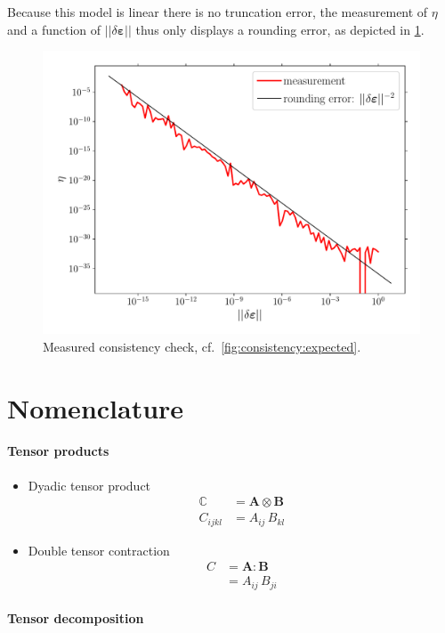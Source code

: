 \documentclass[namecite, fleqn]{goose-article}
\begin{document}
Because this model is linear there is no truncation error, the measurement of $\eta$ and a
function of $|| \delta \bm{\varepsilon} ||$ thus only displays a rounding error,
as depicted in \cref{fig:consistency}.

\begin{figure}[htp]
    \centering
    \includegraphics[width=.5\textwidth]{examples/consistency}
    \caption{Measured consistency check, cf.\ \cref{fig:consistency:expected}.}
    \label{fig:consistency}
\end{figure}

\appendix

\section{Nomenclature}
\label{sec:ap:nomenclature}

\paragraph{Tensor products}
\vspace*{.5eM}

\begin{itemize}

    \item Dyadic tensor product
    \begin{align}
        \mathbb{C} &= \bm{A} \otimes \bm{B} \\
        C_{ijkl} &= A_{ij} \, B_{kl}
    \end{align}

    \item Double tensor contraction
    \begin{align}
        C &= \bm{A} : \bm{B} \\
        &= A_{ij} \, B_{ji}
    \end{align}

\end{itemize}

\paragraph{Tensor decomposition}
\vspace*{.5eM}
\end{document}
